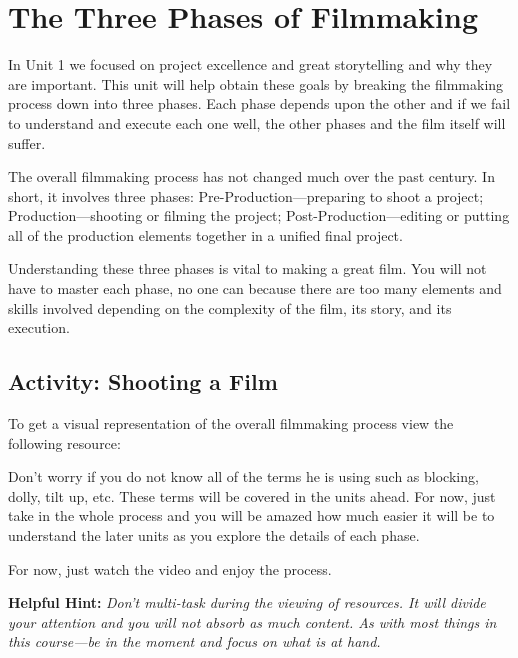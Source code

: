 \documentclass[
]{book}
\begin{document}
\hypertarget{the-three-phases-of-filmmaking}{%
\section{The Three Phases of Filmmaking}\label{the-three-phases-of-filmmaking}}

In Unit 1 we focused on project excellence and great storytelling and why they are important. This unit will help obtain these goals by breaking the filmmaking process down into three phases. Each phase depends upon the other and if we fail to understand and execute each one well, the other phases and the film itself will suffer.

The overall filmmaking process has not changed much over the past century. In short, it involves three phases: Pre-Production---preparing to shoot a project; Production---shooting or filming the project; Post-Production---editing or putting all of the production elements together in a unified final project.

Understanding these three phases is vital to making a great film. You will not have to master each phase, no one can because there are too many elements and skills involved depending on the complexity of the film, its story, and its execution.

\hypertarget{activity-shooting-a-film}{%
\subsection*{Activity: Shooting a Film}\label{activity-shooting-a-film}}

\begin{reflect}
To get a visual representation of the overall filmmaking process view the following resource:

Don't worry if you do not know all of the terms he is using such as blocking, dolly, tilt up, etc. These terms will be covered in the units ahead. For now, just take in the whole process and you will be amazed how much easier it will be to understand the later units as you explore the details of each phase.

For now, just watch the video and enjoy the process.

\textbf{Helpful Hint:} \emph{Don't multi-task during the viewing of resources. It will divide your attention and you will not absorb as much content. As with most things in this course---be in the moment and focus on what is at hand.}
\end{reflect}
\end{document}

